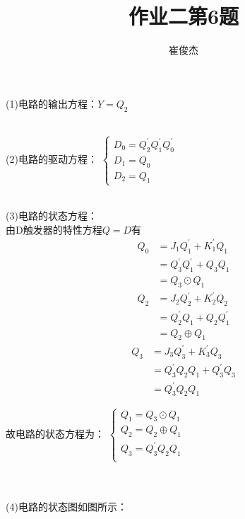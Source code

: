 \documentclass[12pt, a4paper, oneside]{ctexart}
\title{作业二第6题}
\author{崔俊杰}
\begin{document}
\maketitle
\raggedright(1)电路的输出方程：\(Y = Q_2\) \\
\quad \\
\raggedright(2)电路的驱动方程：
$
\begin{cases}

    D_0 = Q_2^{'}Q_1^{'}Q_0^{'} \\
    D_1 = Q_0 \\
    D_2 = Q_1 

\end{cases}
$\\ 
\quad \\
\raggedright(3)电路的状态方程：\\
由D触发器的特性方程\(Q = D\)有\\
\begin{align}
    Q_0 &= J_1Q_1^{'} + K_1^{'}Q_1 \nonumber \\
    &= Q_3^{'}Q_1^{'} + Q_3Q_1 \nonumber \\
    &= Q_3 \odot Q_1 \nonumber
\end{align}
\begin{align}
    Q_2 &= J_2Q_2^{'} + K_2^{'}Q_2 \nonumber \\
    &= Q_2^{'}Q_1 + Q_2Q_1^{'} \nonumber \\
    &= Q_2 \oplus Q_1 \nonumber
\end{align}
\begin{align}
    Q_3 &= J_3Q_3^{'} + K_3^{'}Q_3 \nonumber \\
    &= Q_3^{'}Q_2Q_1 + Q_3^{'}Q_3 \nonumber \\
    &= Q_3^{'}Q_2Q_1 \nonumber
\end{align}
\raggedright 故电路的状态方程为：
$
\begin{cases}
    Q_1 = Q_3 \odot Q_1 \\ 
    Q_2 = Q_2 \oplus Q_1 \\ 
    Q_3 = Q_3^{'}Q_2Q_1 \\
\end{cases}
$\\
\; \\
\; \\
\raggedright(4)电路的状态图如图所示： \\
\end{document}
